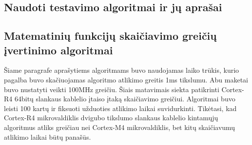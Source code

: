 \documentclass[a4paper, 12pt]{article} %
\begin{document}
\begin{onehalfspacing}
\newpage %
%
\section{Naudoti testavimo algoritmai ir j\k{u} apra\v{s}ai}
\subsection{Matematini\k{u} funkcij\k{u} skai\v{c}iavimo grei\v{c}i\k{u} \k{i}vertinimo algoritmai}
\v{S}iame paragrafe apra\v{s}ytiems algoritmams buvo naudojamas laiko tr\=ukis, kurio pagalba buvo ska\v{c}iuojamas algoritmo atlikimo greitis 1ms tikslumu. Abu maketai buvo nustatyti veikti 100MHz grei\v{c}iu. \v{S}iais matavimais siekta patikrinti Cortex-R4 64bit\k{u} slankaus kablelio \k{i}taiso \k{i}tak\k{a} skai\v{c}iavimo grei\v{c}iui. Algoritmai buvo leisti 100 kart\k{u} ir fiksuoti u\v{z}duoties atlikimo laikai suvidurkinti. Tik\.{e}tasi, kad Cortex-R4 mikrovaldiklis dvigubo tikslumo slankaus kablelio kintam\k{u}j\k{u} algoritmus atliks grei\v{c}iau nei Cortex-M4 mikrovaldiklis, bet kit\k{u} skai\v{c}iavum\k{u} atlikimo laikai b\={u}t\k{u} pana\v{s}\={u}s.

\end{onehalfspacing}
\end{document}
